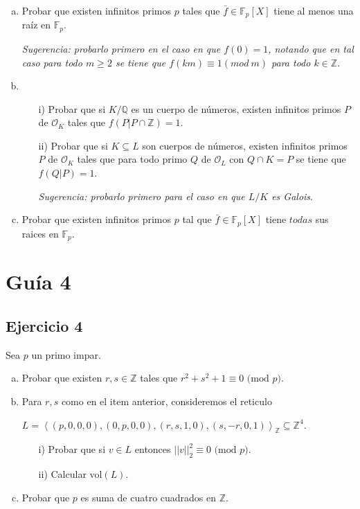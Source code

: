 \documentclass[12pt]{amsart}
\newcommand{\QQ}{\mathbb{Q}}
\newcommand{\ZZ}{\mathbb{Z}}
\newcommand{\FF}{\mathbb{F}}
\newcommand{\OO}{\mathcal{O}}
\newcommand{\lc}{\left<}
\newcommand{\rc}{\right>}
\theoremstyle{plain}
\begin{document}
\begin{enumerate}[a)]
    \item Probar que existen infinitos primos $p$ tales que $\bar{f}\in
    \FF_p[X]$ tiene al menos una raíz en $\FF_p$.

    \textit{Sugerencia: probarlo primero en el caso en que $f(0) = 1$, 
    notando que en tal caso para todo $m \geq 2$ se tiene que 
    $f(km)\equiv 1 (mod\ m)$ para todo $k\in \ZZ$}.
    
    \item \begin{enumerate}
        \item[\textup{i)}] Probar que si $K/\QQ$ es un cuerpo de números, existen 
        infinitos primos $P$ de $\OO_K$ tales que $f(P|P\cap\ZZ)=1$.

        \item[\textup{ii)}] Probar que si $K\subseteq L$ son cuerpos de números, 
        existen infinitos primos $P$ de $\OO_K$ tales que para todo 
        primo $Q$ de $\OO_L$ con $Q\cap K = P$ se tiene que $f(Q|P)=1$.

        \textit{Sugerencia: probarlo primero para el caso en que $L/K$
        es Galois}.
    \end{enumerate}
    
    \item Probar que existen infinitos primos $p$ tal que $\bar{f}\in
    \FF_p[X]$ tiene $todas$ sus raices en $\FF_p$.
\end{enumerate}

\section*{Guía 4}

\subsection*{Ejercicio 4} Sea $p$ un primo impar.
\begin{enumerate}[a)]
    \item Probar que existen $r,s\in\ZZ$ tales que $r^2+s^2+1\equiv0 \text{ (mod } p)$.
    
    \item Para $r,s$ como en el item anterior, consideremos el reticulo
    
    $L=\lc (p,0,0,0),(0,p,0,0),(r,s,1,0),(s,-r,0,1) \rc_\ZZ \subseteq \ZZ^4$.
    \begin{enumerate}
        \item[\textup{i)}] Probar que si $v\in L$ entonces $||v||_2^2\equiv 0\text{ (mod } p)$.

        \item[\textup{ii)}] Calcular vol$(L)$.
    \end{enumerate}
    
    \item Probar que $p$ es suma de cuatro cuadrados en $\ZZ$. 
\end{enumerate}
\end{document}
